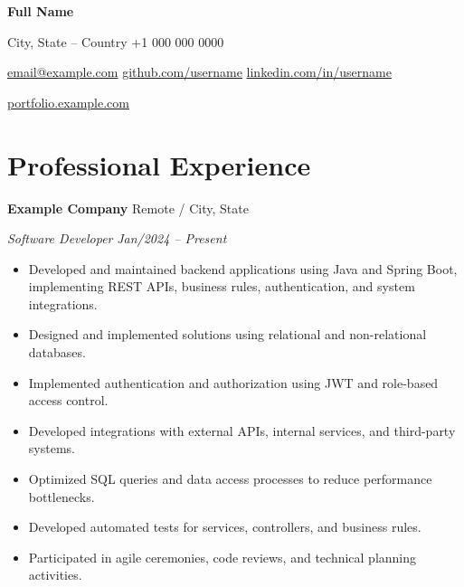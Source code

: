 \documentclass[a4paper,10pt]{article}
\begin{document}

\begin{center}

{\LARGE\textbf{Full Name}}

\vspace{-0.15cm}

City, State -- Country
\quad\textbullet\quad
+1 000 000 0000

\vspace{0.01cm}

\href{mailto:email@example.com}{email@example.com}
\quad\textbullet\quad
\href{https://github.com/username}{github.com/username}
\quad\textbullet\quad
\href{https://www.linkedin.com/in/username}{linkedin.com/in/username}

\vspace{0.03cm}

\href{https://portfolio.example.com}
{portfolio.example.com}

\end{center}

\vspace{-0.30cm}


\section{Professional Experience}

\textbf{Example Company}
\hfill
Remote / City, State

\textit{Software Developer}
\hfill
\textit{Jan/2024 -- Present}

\begin{itemize}

    \item Developed and maintained backend applications using Java and Spring Boot, implementing REST APIs, business rules, authentication, and system integrations.

    \item Designed and implemented solutions using relational and non-relational databases.

    \item Implemented authentication and authorization using JWT and role-based access control.

    \item Developed integrations with external APIs, internal services, and third-party systems.

    \item Optimized SQL queries and data access processes to reduce performance bottlenecks.

    \item Developed automated tests for services, controllers, and business rules.

    \item Participated in agile ceremonies, code reviews, and technical planning activities.

\end{itemize}
\end{document}
